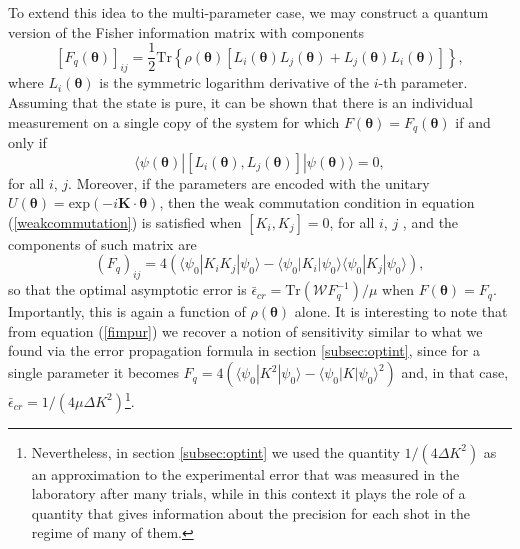 To extend this idea to the multi-parameter case, we may construct a quantum version of the Fisher information matrix with components \cite{helstrom1967mmse, helstrom1976, Szczykulska2016, sammy2016compatibility, proctor2017networked}
\begin{equation}
\left[F_q(\boldsymbol{\theta})\right]_{ij} = \frac{1}{2}\mathrm{Tr}\left\lbrace \rho(\boldsymbol{\theta}) \left[L_i(\boldsymbol{\theta}) L_j(\boldsymbol{\theta}) + L_j(\boldsymbol{\theta}) L_i(\boldsymbol{\theta}) \right] \right\rbrace,
\label{qfimgen}
\end{equation} 
where $L_i(\boldsymbol{\theta})$ is the symmetric logarithm derivative of the $i$-th parameter. Assuming that the state is pure, it can be shown that there is an individual measurement on a single copy of the system for which $F(\boldsymbol{\theta}) = F_q(\boldsymbol{\theta})$ if and only if \cite{sammy2016compatibility, pezze2017simultaneous}
\begin{equation}
\langle \psi(\boldsymbol{\theta})|[L_i(\boldsymbol{\theta}), L_j(\boldsymbol{\theta})]|\psi(\boldsymbol{\theta})\rangle = 0,
\label{weakcommutation}
\end{equation}
for all $i$, $j$. Moreover, if the parameters are encoded with the unitary $U(\boldsymbol{\theta}) = \mathrm{exp}(-i \boldsymbol{K}\cdot \boldsymbol{\theta})$, then the weak commutation condition in equation (\ref{weakcommutation}) is satisfied when $[K_i, K_j] = 0$, for all $i$, $j$ \cite{sammy2016compatibility, pezze2017simultaneous}, and the components of such matrix are
\begin{equation}
(F_q)_{ij} =  4\left( \langle  \psi_0 | K_i K_j |  \psi_0 \rangle - \langle  \psi_0 | K_i |  \psi_0 \rangle \langle  \psi_0 | K_j |  \psi_0 \rangle \right),
\label{fimpur}
\end{equation}
so that the optimal asymptotic error is $\bar{\epsilon}_{cr} = \mathrm{Tr}(\mathcal{W} F_q^{-1})/\mu$ when $F(\boldsymbol{\theta})=F_q$. Importantly, this is again a function of $\rho(\boldsymbol{\theta})$ alone. It is interesting to note that from equation (\ref{fimpur}) we recover a notion of sensitivity similar to what we found via the error propagation formula in section \ref{subsec:optint}, since for a single parameter it becomes $F_q = 4 \left(\langle \psi_0 | K^2 |\psi_0 \rangle -  \langle \psi_0 | K |\psi_0 \rangle^2\right)$ and, in that case, $\bar{\epsilon}_{cr} = 1/(4\mu  \Delta K^2)$\footnote{Nevertheless, in section \ref{subsec:optint} we used the quantity $1/(4\Delta K^2)$ as an approximation to the experimental error that was measured in the laboratory after many trials, while in this context it plays the role of a quantity that gives information about the precision for each shot in the regime of many of them.}. 

